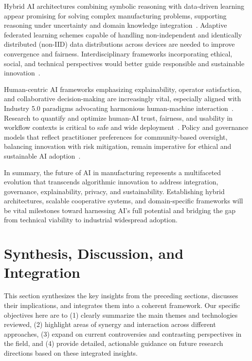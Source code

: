 \documentclass[sigconf]{acmart}
\begin{document}
Hybrid AI architectures combining symbolic reasoning with data-driven learning appear promising for solving complex manufacturing problems, supporting reasoning under uncertainty and domain knowledge integration~\cite{ref6,ref25}. Adaptive federated learning schemes capable of handling non-independent and identically distributed (non-IID) data distributions across devices are needed to improve convergence and fairness. Interdisciplinary frameworks incorporating ethical, social, and technical perspectives would better guide responsible and sustainable innovation~\cite{ref25}.

Human-centric AI frameworks emphasizing explainability, operator satisfaction, and collaborative decision-making are increasingly vital, especially aligned with Industry 5.0 paradigms advocating harmonious human-machine interaction~\cite{ref6,ref35}. Research to quantify and optimize human-AI trust, fairness, and usability in workflow contexts is critical to safe and wide deployment~\cite{ref44}. Policy and governance models that reflect practitioner preferences for community-based oversight, balancing innovation with risk mitigation, remain imperative for ethical and sustainable AI adoption~\cite{ref25}.

In summary, the future of AI in manufacturing represents a multifaceted evolution that transcends algorithmic innovation to address integration, governance, explainability, privacy, and sustainability. Establishing hybrid architectures, scalable cooperative systems, and domain-specific frameworks will be vital milestones toward harnessing AI’s full potential and bridging the gap from technical viability to industrial widespread adoption.

\newpage  
  


\section{Synthesis, Discussion, and Integration}

This section synthesizes the key insights from the preceding sections, discusses their implications, and integrates them into a coherent framework. Our specific objectives here are to (1) clearly summarize the main themes and technologies reviewed, (2) highlight areas of synergy and interaction across different approaches, (3) expand on current controversies and contrasting perspectives in the field, and (4) provide detailed, actionable guidance on future research directions based on these integrated insights.
\end{document}
